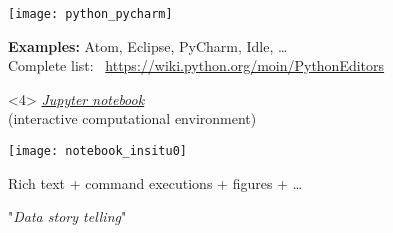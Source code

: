 \begin{frame}[fragile, c]
\begin{onlyenv}
\vfill
\texttt{[image: python\_pycharm]}
\vfill

\textbf{Examples:} Atom, Eclipse, PyCharm, Idle, \ldots\\
Complete list: \faLink~\url{https://wiki.python.org/moin/PythonEditors}
\end{onlyenv}

\begin{onlyenv}<4>
\href{https://jupyter.org/}{\textit{Jupyter notebook}}\\
(interactive computational environment)

\vfill
\texttt{[image: notebook\_insitu0]}
\vfill

Rich text + command executions + figures + \ldots

"\textit{Data story telling}"
\end{onlyenv}

\end{frame}



